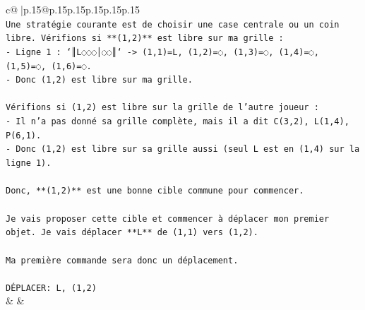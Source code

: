 \documentclass{article}
\begin{document}
{\begin{supertabular}{c@{$\;$}|p{.15\linewidth}@{}p{.15\linewidth}p{.15\linewidth}p{.15\linewidth}p{.15\linewidth}p{.15\linewidth}}
{{{\\ 
\texttt{Une stratégie courante est de choisir une case centrale ou un coin libre. Vérifions si **(1,2)** est libre sur ma grille :} \\
\texttt{{-} Ligne 1 : `║L◌◌◌│◌◌║` {-}> (1,1)=L, (1,2)=◌, (1,3)=◌, (1,4)=◌, (1,5)=◌, (1,6)=◌.} \\
\texttt{{-} Donc (1,2) est libre sur ma grille.} \\
\\ 
\texttt{Vérifions si (1,2) est libre sur la grille de l'autre joueur :} \\
\texttt{{-} Il n'a pas donné sa grille complète, mais il a dit C(3,2), L(1,4), P(6,1).} \\
\texttt{{-} Donc (1,2) est libre sur sa grille aussi (seul L est en (1,4) sur la ligne 1).} \\
\\ 
\texttt{Donc, **(1,2)** est une bonne cible commune pour commencer.} \\
\\ 
\texttt{Je vais proposer cette cible et commencer à déplacer mon premier objet. Je vais déplacer **L** de (1,1) vers (1,2).} \\
\\ 
\texttt{Ma première commande sera donc un déplacement.} \\
\\ 
\texttt{DÉPLACER: L, (1,2)} \\
            }
        }
    }
    & & \\ \\


\end{supertabular}}
\end{document}
